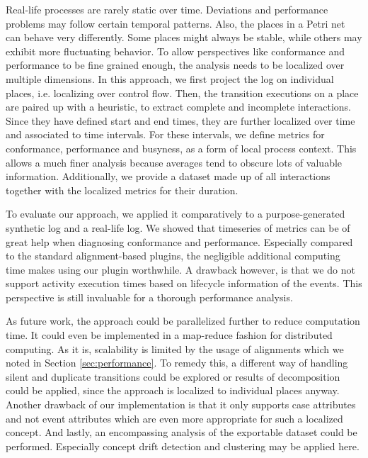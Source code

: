 Real-life processes are rarely static over time. Deviations and performance problems may follow certain temporal patterns. Also, the places in a Petri net can behave very differently. Some places might always be stable, while others may exhibit more fluctuating behavior. To allow perspectives like conformance and performance to be fine grained enough, the analysis needs to be localized over multiple dimensions. In this approach, we first project the log on individual places, i.e. localizing over control flow. Then, the transition executions on a place are paired up with a heuristic, to extract complete and incomplete interactions. Since they have defined start and end times, they are further localized over time and associated to time intervals. For these intervals, we define metrics for conformance, performance and busyness, as a form of local process context. This allows a much finer analysis because averages tend to obscure lots of valuable information. Additionally, we provide a dataset made up of all interactions together with the localized metrics for their duration.

To evaluate our approach, we applied it comparatively to a purpose-generated synthetic log and a real-life log. We showed that timeseries of metrics can be of great help when diagnosing conformance and performance. Especially compared to the standard alignment-based plugins, the negligible additional computing time makes using our plugin worthwhile. A drawback however, is that we do not support activity execution times based on lifecycle information of the events. This perspective is still invaluable for a thorough performance analysis.

As future work, the approach could be parallelized further to reduce computation time. It could even be implemented in a map-reduce fashion for distributed computing. As it is, scalability is limited by the usage of alignments which we noted in Section \ref{sec:performance}. To remedy this, a different way of handling silent and duplicate transitions could be explored or results of decomposition could be applied, since the approach is localized to individual places anyway.
Another drawback of our implementation is that it only supports case attributes and not event attributes which are even more appropriate for such a localized concept. And lastly, an encompassing analysis of the exportable dataset could be performed. Especially concept drift detection and clustering may be applied here.
